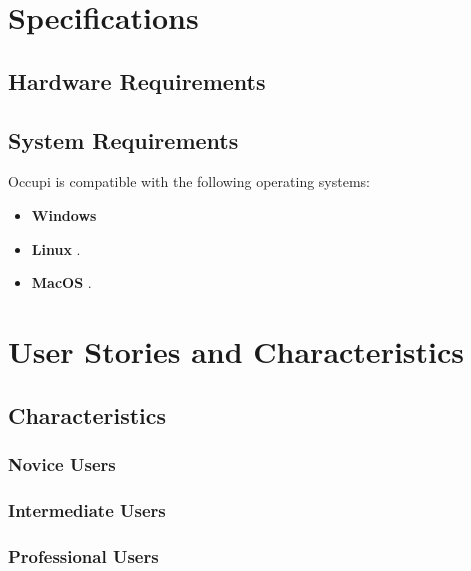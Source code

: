 \documentclass[11pt,a4paper]{article}
\begin{document}
\pagebreak


\section*{Specifications}

\subsection*{Hardware Requirements}
\begin{itemize}


\end{itemize}

\subsection*{System Requirements}

Occupi is compatible with the following operating systems:
\begin{itemize}
    \item[\textbullet] \textbf{Windows}
    \item[\textbullet] \textbf{Linux }.
    \item[\textbullet] \textbf{MacOS }.
\end{itemize}


\section*{User Stories and Characteristics}

\subsection*{Characteristics}

\subsubsection*{Novice Users}


\subsubsection*{Intermediate Users}


\subsubsection*{Professional Users}
\end{document}
